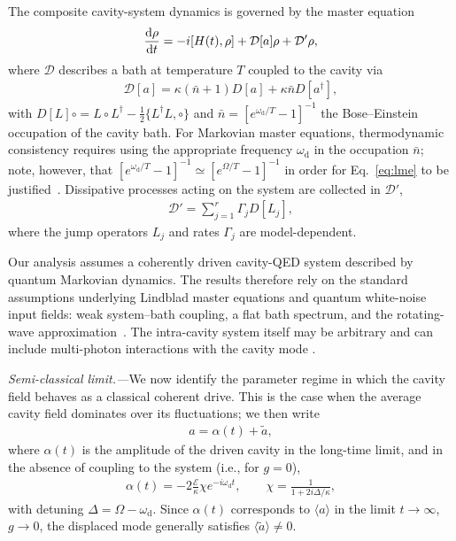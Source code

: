 \documentclass[aps,twocolumn,10pt,prl,floatfix,nofootinbib, superscriptaddress]{revtex4-2}
\newcommand{\nb}{\bar{n}}
\begin{document}
The composite cavity-system dynamics is governed by the master equation
\begin{align}
\dv{\rho}{t} = -i[H(t),\rho] + \mathcal{D}[a]\rho + \mathcal{D}'\rho,
\label{eq:lme}
\end{align}
where $\mathcal{D}$ describes a bath at temperature $T$ coupled to the cavity via
\begin{align}
\mathcal{D}[a]
= \kappa(\nb+1)D[a] + \kappa\nb D[a^\dagger],
\end{align}
with $D[L]\circ = L\circ L^\dagger - \tfrac12\{L^\dagger L,\circ\}$ and $\nb= [e^{\omega_\text{d}/T}-1]^{-1}$ the Bose–Einstein occupation of the cavity bath. For Markovian master equations, thermodynamic consistency requires using the appropriate frequency $\omega_\text{d}$ in the occupation $\nb$; note, however, that $[e^{\omega_\text{d}/T}-1]^{-1}\simeq [e^{\Omega/T}-1]^{-1}$ in order for Eq.~\eqref{eq:lme} to be justified~\cite{Wacker2022, Potts_2021}. Dissipative processes
acting on the system  are collected in $\mathcal{D}'$,
\begin{align}
\mathcal{D}' = \sum_{j=1}^r \Gamma_j D[L_j],
\end{align}
where the jump operators $L_j$ and rates $\Gamma_j$ are model-dependent.


Our analysis assumes a coherently driven cavity-QED system described by quantum Markovian dynamics. The results therefore rely on the standard assumptions underlying Lindblad master equations and quantum white-noise input fields: weak system–bath coupling, a flat bath spectrum, and the rotating-wave approximation~\cite{gardiner_1985, Breuer&Petruccione2002}. The intra-cavity system itself may be arbitrary and can include multi-photon interactions with the cavity mode \cite{supmat}.



\textit{Semi-classical limit.—}We now identify the parameter regime in which the cavity field behaves as a classical coherent drive.  This is the case when the average cavity field dominates over its fluctuations; we then write
\begin{align}
a = \alpha(t) + \tilde{a},
\end{align}
where $\alpha(t)$ is the amplitude of the driven cavity in the long-time limit, and in the absence of coupling to the system (i.e., for $g=0$),
\begin{align}
\alpha(t) = -2\frac{\mathcal{E}}{\kappa} \chi e^{-i\omega_\text{d}t},
\qquad
\chi = \frac{1}{1+2i\Delta/\kappa},
\end{align}
with detuning $\Delta = \Omega - \omega_\text{d}$.
Since $\alpha(t)$ corresponds to $\langle a\rangle$ in the limit $t\to\infty$, $g\to0$, the displaced mode generally satisfies $\langle\tilde{a}\rangle \neq 0$.
\end{document}
